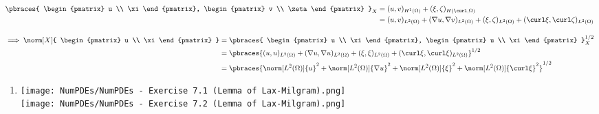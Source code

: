
\begin{solution}

\phantom{}

\begin{align*}
  \pbraces
  {
    \begin{pmatrix}
      u \\ \xi
    \end{pmatrix},
    \begin{pmatrix}
      v \\ \zeta
    \end{pmatrix}
  }_X
  & =
  (u, v)_{H^1(\Omega)}
  +
  (\xi, \zeta)_{H(\curl, \Omega)} \\
  & =
  (u, v)_{L^2(\Omega)}
  +
  (\nabla u, \nabla v)_{L^2(\Omega)}
  +
  (\xi, \zeta)_{L^2(\Omega)}
  +
  (\curl \xi, \curl \zeta)_{L^2(\Omega)}
\end{align*}

\begin{align*}
  \implies
  \norm[X]
  {
    \begin{pmatrix}
      u \\ \xi
    \end{pmatrix}
  }
  & =
  \pbraces
  {
    \begin{pmatrix}
      u \\ \xi
    \end{pmatrix},
    \begin{pmatrix}
      u \\ \xi
    \end{pmatrix}
  }_X^{1/2} \\
  & =
  \pbraces
  {
    (u, u)_{L^2(\Omega)}
    +
    (\nabla u, \nabla u)_{L^2(\Omega)}
    +
    (\xi, \xi)_{L^2(\Omega)}
    +
    (\curl \xi, \curl \xi)_{L^2(\Omega)}
  }^{1/2} \\
  & =
  \pbraces
  {
    \norm[L^2(\Omega)]{u}^2
    +
    \norm[L^2(\Omega)]{\nabla u}^2
    +
    \norm[L^2(\Omega)]{\xi}^2
    +
    \norm[L^2(\Omega)]{\curl \xi}^2
  }^{1/2}
\end{align*}

\begin{enumerate}[label = \textbf{\alph*)}]

  \item \phantom{}

  \begin{center}
    \texttt{[image: NumPDEs/NumPDEs - Exercise 7.1 (Lemma of Lax-Milgram).png]} \\
    \texttt{[image: NumPDEs/NumPDEs - Exercise 7.2 (Lemma of Lax-Milgram).png]}
  \end{center}


\end{enumerate}
\end{solution}
